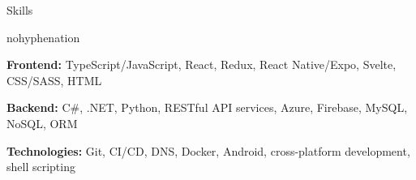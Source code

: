\documentclass[
	10pt, %
]{article} %
\begin{document}
\printname

\begin{rSection}{Skills}
	\begin{hyphenrules}{nohyphenation}

		\begin{rSubsection}{}{}{}{}
			\item[] \textbf{Frontend:} TypeScript/JavaScript, React, Redux, React Native/Expo, Svelte, CSS/SASS, HTML
			\item[] \textbf{Backend:} C\#, .NET, Python, RESTful API services, Azure, Firebase, MySQL, NoSQL, ORM
			\item[] \textbf{Technologies:} Git, CI/CD, DNS, Docker, Android, cross-platform development, shell scripting
		\end{rSubsection}

	\end{hyphenrules}
\end{rSection}
\end{document}
